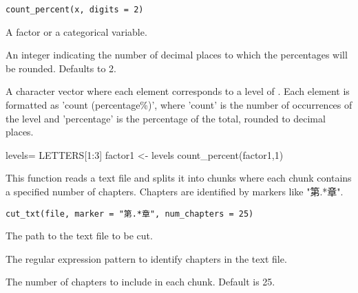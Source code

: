 \documentclass[a4paper]{book}
\begin{document}
%
\begin{Usage}
\begin{verbatim}
count_percent(x, digits = 2)
\end{verbatim}
\end{Usage}
%
\begin{Arguments}
\begin{ldescription}
\item[\code{x}] A factor or a categorical variable.

\item[\code{digits}] An integer indicating the number of decimal places to which the
percentages will be rounded. Defaults to 2.
\end{ldescription}
\end{Arguments}
%
\begin{Value}
A character vector where each element corresponds to a level of .
Each element is formatted as 'count (percentage\%)', where 'count' is the number of occurrences of the level
and 'percentage' is the percentage of the total, rounded to  decimal places.
\end{Value}
%
\begin{Examples}
\begin{ExampleCode}
levels= LETTERS[1:3]
factor1 <- levels%
count_percent(factor1,1)

\end{ExampleCode}
\end{Examples}
%
\begin{Description}
This function reads a text file and splits it into chunks where each chunk contains a specified number of chapters.
Chapters are identified by markers like "第.*章".
\end{Description}
%
\begin{Usage}
\begin{verbatim}
cut_txt(file, marker = "第.*章", num_chapters = 25)
\end{verbatim}
\end{Usage}
%
\begin{Arguments}
\begin{ldescription}
\item[\code{file}] The path to the text file to be cut.

\item[\code{marker}] The regular expression pattern to identify chapters in the text file.

\item[\code{num\_chapters}] The number of chapters to include in each chunk. Default is 25.
\end{ldescription}
\end{Arguments}
\end{document}
